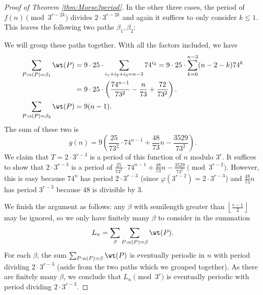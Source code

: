 \begin{proof}[Proof of Theorem \ref{thm:Morse3period}]
    In the other three cases, the period of $f(n)\pmod{3^{r-2k}}$ divides $2\cdot 3^{r-2k}$ and again it suffices to only consider $k\leq 1$. This leaves the following two paths $\beta_1, \beta_2$:
    \begin{center}
    \end{center}
    We will group these paths together. With all the factors included, we have
    \begin{align*}
        \sum_{P: \alpha(P)=\beta_1}\wt(P) &= 9\cdot 25\cdot\sum_{i_1+i_2+i_3=n-3}74^{i_2} = 9\cdot 25\cdot \sum_{k=0}^{n-3}(n-2-k)74^k \\
        &=9\cdot 25\cdot\left(\frac{74^{n-1}}{73^2}-\frac{n}{73}+\frac{72}{73^2}\right). \\
        \sum_{P: \alpha(P)=\beta_2}\wt(P) &= 9(n-1). \\
    \end{align*}
    The sum of these two is
    \[g(n)=9\left(\frac{25}{73^2}\cdot 74^{n-1}+\frac{48}{73}n-\frac{3529}{73^2}\right).\]
    We claim that $T=2\cdot 3^{r-3}$ is a period of this function of $n$ modulo $3^r$. It suffices to show that $2\cdot 3^{r-3}$ is a period of $\frac{25}{73^2}\cdot 74^{n-1}+\frac{48}{73}n-\frac{3529}{73^2}\pmod{3^{r-2}}$. However, this is easy because $74^n$ has period $2\cdot 3^{r-3}$ (since $\varphi(3^{r-2})=2\cdot 3^{r-3}$) and $\frac{48}{73}n$ has period $3^{r-3}$ because $48$ is divisible by $3$.
    
    We finish the argument as follows: any $\beta$ with semilength greater than $\left\lfloor\frac{r-1}{2}\right\rfloor$ may be ignored, so we only have finitely many $\beta$ to consider in the summation
    \[L_n=\sum_{\beta}\sum_{P: \alpha(P)=\beta}\wt(P).\]
    For each $\beta$, the sum $\sum_{P: \alpha(P)=\beta}\wt(P)$ is eventually periodic in $n$ with period dividing $2\cdot 3^{r-3}$ (aside from the two paths which we grouped together). As there are finitely many $\beta$, we conclude that $L_n\pmod{3^r}$ is eventually periodic with period dividing $2\cdot 3^{r-3}$.
\end{proof}

